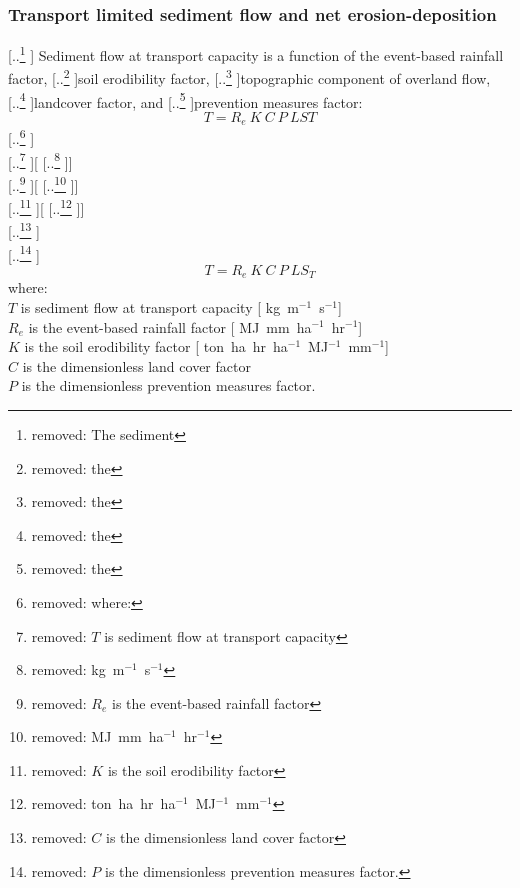\documentclass[gmd, manuscript]{copernicus}
\providecommand{\DIFadd}[1]{{\protect\color{blue} \sf #1}} %
\providecommand{\DIFdel}[1]{{\protect\color{red} [..\footnote{removed: #1} ]}} %
\providecommand{\DIFaddbegin}{} %
\providecommand{\DIFaddend}{} %
\providecommand{\DIFdelbegin}{} %
\providecommand{\DIFdelend}{} %
\begin{document}
\DIFaddbegin \subsubsection{\DIFadd{Transport limited sediment flow and net erosion-deposition}}
\DIFaddend %
\noindent
\DIFdelbegin \DIFdel{The sediment }\DIFdelend \DIFaddbegin \DIFadd{Sediment }\DIFaddend flow at transport capacity is a function of 
the event-based rainfall factor, \DIFdelbegin \DIFdel{the }\DIFdelend soil erodibility factor, 
\DIFdelbegin \DIFdel{the }\DIFdelend topographic component of overland flow,
\DIFdelbegin \DIFdel{the }\DIFdelend landcover factor, and \DIFdelbegin \DIFdel{the }\DIFdelend prevention measures factor:
%
\DIFdelbegin \begin{displaymath}
{T = R_e ~ K ~ C ~ P ~ LST}
\end{displaymath}
{\DIFdel{\small
\noindent
where: }\\
\DIFdel{\noindent
\hspace*{0.5em} $T$ is sediment flow at transport capacity }[\DIFdel{\unit{kg~m}$^{-1}$~\unit{s}$^{-1}$}]\\ 
\DIFdel{\hspace*{0.5em} $R_e$ is the event-based rainfall factor }[\DIFdel{\unit{MJ~mm~ha}$^{-1}$~\unit{hr}$^{-1}$}]\\
\DIFdel{\hspace*{0.5em} $K$ is the soil erodibility factor }[\DIFdel{\unit{ton~ha~hr~ha}$^{-1}$~\unit{MJ}$^{-1}$~\unit{mm}$^{-1}$}]\\ 
\DIFdel{\hspace*{0.5em} $C$ is the dimensionless land cover factor}\\
\DIFdel{\hspace*{0.5em} $P$ is the dimensionless prevention measures factor.}\\
}
\DIFdelend \DIFaddbegin \begin{equation}
\label{eq:usped}
{T = R_e ~ K ~ C ~ P ~ LS_T}
\end{equation}
{\DIFadd{\small
\noindent
where: }\\
\DIFadd{\noindent
\hspace*{0.5em} $T$ is sediment flow at transport capacity }[\DIFadd{\unit{kg~m}$^{-1}$~\unit{s}$^{-1}$}]\\ 
\DIFadd{\hspace*{0.5em} $R_e$ is the event-based rainfall factor }[\DIFadd{\unit{MJ~mm~ha}$^{-1}$~\unit{hr}$^{-1}$}]\\
\DIFadd{\hspace*{0.5em} $K$ is the soil erodibility factor }[\DIFadd{\unit{ton~ha~hr~ha}$^{-1}$~\unit{MJ}$^{-1}$~\unit{mm}$^{-1}$}]\\ 
\DIFadd{\hspace*{0.5em} $C$ is the dimensionless land cover factor}\\
\DIFadd{\hspace*{0.5em} $P$ is the dimensionless prevention measures factor.}\\
}
\DIFaddend 
\end{document}
